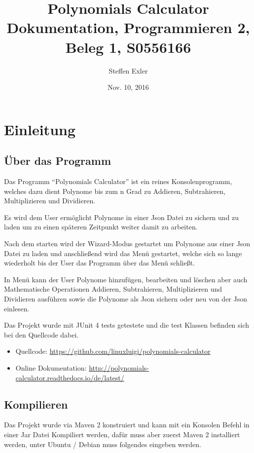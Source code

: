 \documentclass[letterpaper,10pt,ngerman]{sphinxmanual}
\title{Polynomials Calculator Dokumentation, Programmieren 2, Beleg 1, S0556166}
\date{Nov. 10, 2016}
\author{Steffen Exler}
\begin{document}
\maketitle
\tableofcontents
{}\label{index::doc}



\chapter{Einleitung}
\label{index:polynomials-calculator-doc}\label{index:einleitung}

\section{Über das Programm}
\label{intro::doc}\label{intro:uber-das-programm}
Das Programm ``Polynomials Calculator'' ist ein reines Konsolenprogramm, welches dazu dient Polynome
bis zum n Grad zu Addieren, Subtrahieren, Multiplizieren und Dividieren.

Es wird dem User ermöglicht Polynome in einer Json Datei zu sichern und zu laden um zu einen späteren
Zeitpunkt weiter damit zu arbeiten.

Nach dem starten wird der Wizard-Modus gestartet um Polynome aus einer Json Datei zu laden und anschließend
wird das Menü gestartet, welche sich so lange wiederholt bis der User das Programm über das Menü schließt.

In Menü kann der User Polynome hinzufügen, bearbeiten und löschen aber auch Mathematische Operationen
Addieren, Subtrahieren, Multiplizieren und Dividieren ausführen sowie die Polynome als Json sichern
oder neu von der Json einlesen.

Das Projekt wurde mit JUnit 4 tests getestete und die test Klassen befinden sich bei den Quellcode dabei.
\begin{itemize}
\item {} 
Quellcode: \url{https://github.com/linuxluigi/polynomials-calculator}

\item {} 
Online Dokumentation: \url{http://polynomials-calculator.readthedocs.io/de/latest/}

\end{itemize}

\noindent{}


\section{Kompilieren}
\label{intro:kompilieren}
Das Projekt wurde via Maven 2 konstruiert und kann mit ein Konsolen Befehl in einer Jar Datei Kompiliert werden, dafür
muss aber zuerst Maven 2 installiert werden, unter Ubuntu / Debian muss folgendes eingeben werden.
\end{document}
